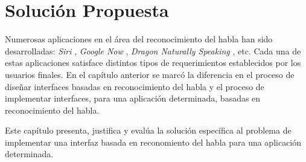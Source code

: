 \chapter{Soluci\'on Propuesta}
\label{sec:solucion}

Numerosas aplicaciones en el \'area del reconocimiento del habla han sido desarrolladas: \emph{Siri} \cite{AppleSiri}, \emph{Google Now} \cite{GoogleNow}, 
\emph{Dragon Naturally Speaking} \cite{DragonNaturallySpeaking}, etc. Cada una de estas
aplicaciones satisface distintos tipos de requerimientos establecidos por los usuarios finales. En el
cap\'itulo anterior se marc\'o la diferencia en el proceso de dise\~nar interfaces basadas en reconocimiento
del habla y el proceso de implementar interfaces, para una aplicaci\'on determinada, basadas en reconocimiento del habla.

Este cap\'itulo presenta, justifica y eval\'ua la soluci\'on espec\'ifica al problema de implementar una interfaz
basada en reconomiento del habla para una aplicaci\'on determinada.




